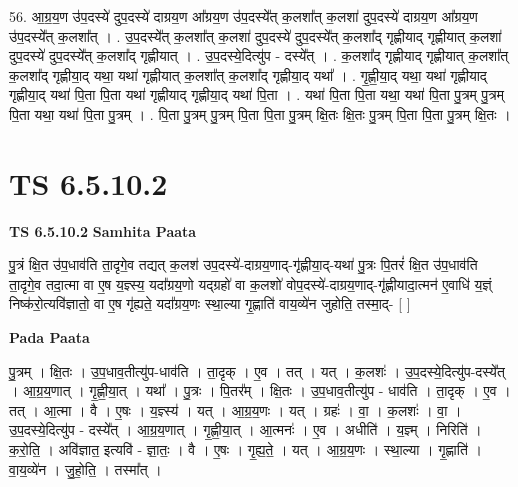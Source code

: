 \documentclass[17pt]{extarticle}
\begin{document}
56. आ॒ग्र॒य॒ण उ॑प॒दस्ये॑ दुप॒दस्ये॑ दाग्रय॒ण आ᳚ग्रय॒ण उ॑प॒दस्ये᳚त् क॒लशा᳚त् क॒लशा॑ दुप॒दस्ये॑ दाग्रय॒ण आ᳚ग्रय॒ण उ॑प॒दस्ये᳚त् क॒लशा᳚त् । . उ॒प॒दस्ये᳚त् क॒लशा᳚त् क॒लशा॑ दुप॒दस्ये॑ दुप॒दस्ये᳚त् क॒लशा᳚द् गृह्णीयाद् गृह्णीयात् क॒लशा॑ दुप॒दस्ये॑ दुप॒दस्ये᳚त् क॒लशा᳚द् गृह्णीयात् । . उ॒प॒दस्ये॒दित्यु॑प - दस्ये᳚त् । . क॒लशा᳚द् गृह्णीयाद् गृह्णीयात् क॒लशा᳚त् क॒लशा᳚द् गृह्णीया॒द् यथा॒ यथा॑ गृह्णीयात् क॒लशा᳚त् क॒लशा᳚द् गृह्णीया॒द् यथा᳚ । . गृ॒ह्णी॒या॒द् यथा॒ यथा॑ गृह्णीयाद् गृह्णीया॒द् यथा॑ पि॒ता पि॒ता यथा॑ गृह्णीयाद् गृह्णीया॒द् यथा॑ पि॒ता । . यथा॑ पि॒ता पि॒ता यथा॒ यथा॑ पि॒ता पु॒त्रम् पु॒त्रम् पि॒ता यथा॒ यथा॑ पि॒ता पु॒त्रम् । . पि॒ता पु॒त्रम् पु॒त्रम् पि॒ता पि॒ता पु॒त्रम् क्षि॒तः क्षि॒तः पु॒त्रम् पि॒ता पि॒ता पु॒त्रम् क्षि॒तः । \newline
\pagebreak
{}

\section{ TS 6.5.10.2 }

\textbf{TS 6.5.10.2 } \newline
\textbf{Samhita Paata} \newline

पु॒त्रं क्षि॒त उ॑प॒धाव॑ति ता॒दृगे॒व तद्यत् क॒लश॑ उप॒दस्ये॑-दाग्रय॒णाद्-गृ॑ह्णीया॒द्-यथा॑ पु॒त्रः पि॒तरं॑ क्षि॒त उ॑प॒धाव॑ति ता॒दृगे॒व तदा॒त्मा वा ए॒ष य॒ज्ञ्स्य॒ यदा᳚ग्रय॒णो यद्ग्रहो॑ वा क॒लशो॑ वोप॒दस्ये॑-दाग्रय॒णाद्-गृ॑ह्णीयादा॒त्मन॑ ए॒वाधि॑ य॒ज्ञ्ं निष्क॑रो॒त्यवि॑ज्ञातो॒ वा ए॒ष गृ॑ह्यते॒ यदा᳚ग्रय॒णः स्था॒ल्या गृ॒ह्णाति॑ वाय॒व्ये॑न जुहोति॒ तस्मा॒द्- [  ] \newline

\textbf{Pada Paata} \newline

पु॒त्रम् । क्षि॒तः । उ॒प॒धाव॒तीत्यु॑प-धाव॑ति । ता॒दृक् । ए॒व । तत् । यत् । क॒लशः॑ । उ॒प॒दस्ये॒दित्यु॑प-दस्ये᳚त् । आ॒ग्र॒य॒णात् । गृ॒ह्णी॒या॒त् । यथा᳚ । पु॒त्रः । पि॒तर᳚म् । क्षि॒तः । उ॒प॒धाव॒तीत्यु॑प - धाव॑ति । ता॒दृक् । ए॒व । तत् । आ॒त्मा । वै । ए॒षः । य॒ज्ञ्स्य॑ । यत् । आ॒ग्र॒य॒णः । यत् । ग्रहः॑ । वा॒ । क॒लशः॑ । वा॒ । उ॒प॒दस्ये॒दित्यु॑प - दस्ये᳚त् । आ॒ग्र॒य॒णात् । गृ॒ह्णी॒या॒त् । आ॒त्मनः॑ । ए॒व । अधीति॑ । य॒ज्ञ्म् । निरिति॑ । क॒रो॒ति॒ । अवि॑ज्ञात॒ इत्यवि॑ - ज्ञा॒तः॒ । वै । ए॒षः । गृ॒ह्य॒ते॒ । यत् । आ॒ग्र॒य॒णः । स्था॒ल्या । गृ॒ह्णाति॑ । वा॒य॒व्ये॑न । जु॒हो॒ति॒ । तस्मा᳚त् ।  \newline
\end{document}
